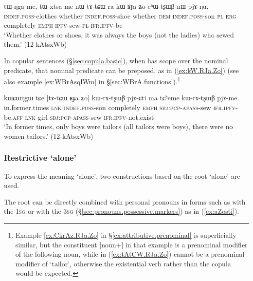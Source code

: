  
\begin{exe}
\ex \label{ex:kW.RJa.Zo}
 \gll tɯ-ŋga me, tɯ-xtsa me nɯ tɤ-tɕɯ ra kɯ ʁɟa ʑo cʰɯ-tʂɯβ-nɯ pjɤ-ŋu. \\
 \textsc{indef}.\textsc{poss}-clothes whether  \textsc{indef}.\textsc{poss}-shoe whether \textsc{dem} \textsc{indef}.\textsc{poss}-son \textsc{pl} \textsc{erg} completely \textsc{emph} \textsc{ipfv}-sew-\textsc{pl} \textsc{ifr}.\textsc{ipfv}-be \\
 \glt `Whether clothes or shoes, it was always the boys (not the ladies) who sewed them.' (12-kAtsxWb)
\end{exe}

In copular sentences (§\ref{sec:copula.basic}), when  has scope over the nominal predicate, that nominal predicate can be preposed, as in (\ref{ex:kW.RJa.Zo}) (see also example \ref{ex:WBrAsqlWm} in §\ref{sec:WBrA.functions}).\footnote{Example \ref{ex:CkrAz.RJa.Zo} in §\ref{ex:attributive.prenominal} is superficially similar, but the constituent [noun+]  in that example is a prenominal modifier of the following noun, while in (\ref{ex:tAtCW.RJa.Zo})  cannot be a prenominal modifier of  `tailor', otherwise the existential verb  rather than the copula  would be expected. }
  
\begin{exe}
\ex \label{ex:tAtCW.RJa.Zo}
 \gll  kɯɕɯŋgɯ tɕe [tɤ-tɕɯ ʁɟa ʑo] kɯ-rɤ-tʂɯβ pjɤ-ɕti ma tɕʰeme kɯ-rɤ-tʂɯβ pjɤ-me. \\
 in.former.times \textsc{lnk} \textsc{indef}.\textsc{poss}-son completely \textsc{emph} \textsc{sbj}:\textsc{pcp}-\textsc{apass}-sew \textsc{ifr}.\textsc{ipfv}-be.\textsc{aff} \textsc{lnk} girl \textsc{sbj}:\textsc{pcp}-\textsc{apass}-sew \textsc{ifr}.\textsc{ipfv}-not.exist \\
 \glt  `In former times, only boys were tailors (all tailors were boys), there were no women tailors.' (12-kAtsxWb)
\end{exe}

\subsubsection{Restrictive `alone'} \label{sec:stWsti}
To express the meaning `alone', two constructions based on the root  `alone' are used.

The root  can be directly combined with personal pronouns in forms such as  with the \textsc{1sg}  or  with the \textsc{3sg}   (§\ref{sec:pronouns.possessive.markers}) as in (\ref{ex:aZosti}).

